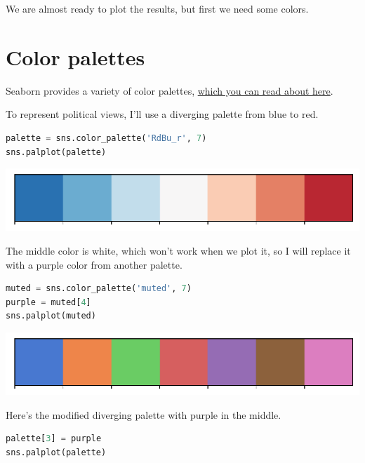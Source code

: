 We are almost ready to plot the results, but first we need some colors.

\hypertarget{color-palettes}{%
\section{Color palettes}\label{color-palettes}}

Seaborn provides a variety of color palettes,
\href{https://seaborn.pydata.org/tutorial/color_palettes.html}{which you
can read about here}.

To represent political views, I'll use a diverging palette from blue to
red.

\begin{lstlisting}[language=Python]
palette = sns.color_palette('RdBu_r', 7)
sns.palplot(palette)
\end{lstlisting}

\begin{center}
\includegraphics[scale=0.75]{02_polviews_files/02_polviews_74_0.pdf}
\end{center}

The middle color is white, which won't work when we plot it, so I will
replace it with a purple color from another palette.

\begin{lstlisting}[language=Python]
muted = sns.color_palette('muted', 7)
purple = muted[4]
sns.palplot(muted)
\end{lstlisting}

\begin{center}
\includegraphics[scale=0.75]{02_polviews_files/02_polviews_76_0.pdf}
\end{center}

Here's the modified diverging palette with purple in the middle.

\begin{lstlisting}[language=Python]
palette[3] = purple
sns.palplot(palette)
\end{lstlisting}

